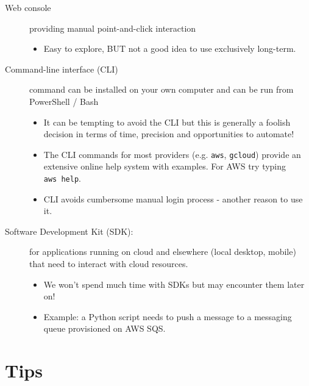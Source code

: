 \begin{description}
\item[Web console]
providing manual point-and-click interaction

\begin{itemize}

\item
  Easy to explore, BUT not a good idea to use exclusively long-term.
\end{itemize}
\item[Command-line interface (CLI)]
command can be installed on your own computer and can be run from
PowerShell / Bash

\begin{itemize}
\item
  It can be tempting to avoid the CLI but this is generally a foolish
  decision in terms of time, precision and opportunities to automate!
\item
  The CLI commands for most providers (e.g. \texttt{aws},
  \texttt{gcloud}) provide an extensive online help system with
  examples. For AWS try typing \texttt{aws\ help}.
\item
  CLI avoids cumbersome manual login process - another reason to use it.
\end{itemize}
\item[Software Development Kit (SDK):]
for applications running on cloud and elsewhere (local desktop, mobile)
that need to interact with cloud resources.

\begin{itemize}
\item
  We won't spend much time with SDKs but may encounter them later on!
\item
  Example: a Python script needs to push a message to a messaging queue
  provisioned on AWS SQS.
\end{itemize}
\end{description}



\section{Tips}
\label{sec:tips}


